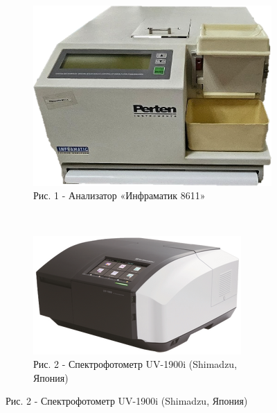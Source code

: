\begin{figure}[H]
  \centering
  \begin{subfigure}[b]{0.45\textwidth}
    \includegraphics[width=\textwidth]{media/pish2/image18}
    \caption*{Рис. 1 - Анализатор «Инфраматик 8611»}
  \end{subfigure}%
  ~%
  \begin{subfigure}[b]{0.45\textwidth}
    \includegraphics[width=\textwidth]{media/pish2/image19}
    \caption*{Рис. 2 - Спектрофотометр UV-1900i (Shimadzu, Япония)}
  \end{subfigure}
\end{figure}

